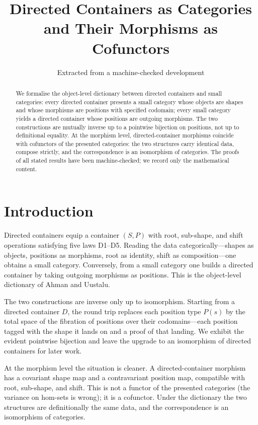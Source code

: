 \documentclass[11pt,a4paper]{article}
\title{Directed Containers as Categories\\
  and Their Morphisms as Cofunctors}
\author{Extracted from a machine-checked development}
\date{}
\theoremstyle{plain}
\theoremstyle{definition}
\begin{document}
\maketitle

\begin{abstract}
We formalise the object-level dictionary between directed containers and small
categories: every directed container presents a small category whose objects
are shapes and whose morphisms are positions with specified codomain; every
small category yields a directed container whose positions are outgoing
morphisms. The two constructions are mutually inverse up to a pointwise
bijection on positions, not up to definitional equality. At the morphism
level, directed-container morphisms coincide with cofunctors of the presented
categories: the two structures carry identical data, compose strictly, and the
correspondence is an isomorphism of categories. The proofs of all stated
results have been machine-checked; we record only the mathematical content.
\end{abstract}

\tableofcontents
\bigskip

\section{Introduction}

Directed containers equip a container $(S,P)$ with root, sub-shape, and shift
operations satisfying five laws D1--D5. Reading the data categorically---shapes
as objects, positions as morphisms, root as identity, shift as
composition---one obtains a small category. Conversely, from a small category
one builds a directed container by taking outgoing morphisms as positions.
This is the object-level dictionary of Ahman and Uustalu.

The two constructions are inverse only up to isomorphism. Starting from a
directed container $D$, the round trip replaces each position type $P(s)$ by
the total space of the fibration of positions over their codomains---each
position tagged with the shape it lands on and a proof of that landing. We
exhibit the evident pointwise bijection and leave the upgrade to an
isomorphism of directed containers for later work.

At the morphism level the situation is cleaner. A directed-container morphism
has a covariant shape map and a contravariant position map, compatible with
root, sub-shape, and shift. This is not a functor of the presented categories
(the variance on hom-sets is wrong); it is a cofunctor. Under the dictionary
the two structures are definitionally the same data, and the correspondence is
an isomorphism of categories.
\end{document}

